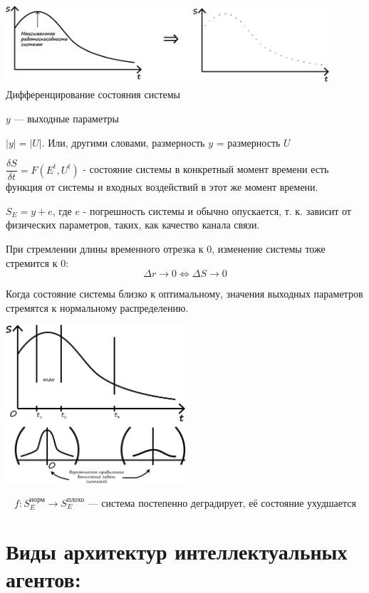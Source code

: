 \documentclass[12pt]{article}
\begin{document}
\begin{sloppypar}
    \begin{center}
        \includegraphics[width=0.9\textwidth]{graphics/Состояние системы.png}
        Дифференцирование состояния системы
    \end{center}

    $y$ — выходные параметры

    $|y| = |U|$. Или, другими словами, размерность $y$ = размерность $U$

    $\dfrac{\delta S}{\delta t} = F(E^t, U^t)$ - состояние системы в конкретный
    момент времени есть функция от системы и входных воздействий в этот же
    момент времени.

    $S_E = y + e$, где $e$ - погрешность системы и обычно опускается, т. к.
    зависит от физических параметров, таких, как качество канала связи.

    При стремлении длины временного отрезка к 0, изменение системы тоже стремится к 0:
    \[
        \Delta r \rightarrow 0 \Leftrightarrow \Delta S \rightarrow 0
    \]

    Когда состояние системы близко к оптимальному, значения выходных параметров стремятся к нормальному распределению.

    \includegraphics[width=0.5\textwidth]{graphics/Состояния системы и нормальное распределение.png}

    \[
        f: S_E^{\text{норм}} \rightarrow S_E^{\text{плохо}} \text{ — система
            постепенно деградирует, её состояние ухудшается}
    \]

    \section{Виды архитектур интеллектуальных агентов:}

\end{sloppypar}
\end{document}

